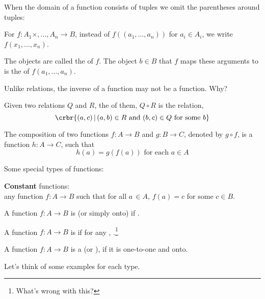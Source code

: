 \documentclass[11pt]{article}
\begin{document}
{ \item When the domain of a function consists of tuples we omit the parentheses
 around tuples: 
 
\item[] For $f: A_1\times,\ldots,A_n \rightarrow B$,
  instead of $f((a_1,\ldots,a_n))$ for $a_i\in A_i$, we write $f(x_1,\ldots,x_n)$.
 
\item[] The objects  are called the  of
$f$. The object $b\in B$ that $f$ maps these arguments to is the  of
$f(a_1,\ldots,a_n)$.


\hrulefill
\begin{uexercise}\label{ex-inverse}
Unlike relations, the inverse of a function may not be a function. Why?
\end{uexercise}
\hrulefill


\item Given two relations $Q$ and $R$,
the  of them, $Q\circ R$ is the relation,
\[
\crbr{(a,c)\,|\, (a,b) \in R \text{ and } (b,c) \in Q \text{ for some } b}
\]


\item The composition of two functions $f:A\rightarrow B$ and $g:B\rightarrow C$,
denoted by $g\circ f$, is a function $h:A \rightarrow C$, such that
\[
h(a) = g(f(a)) \text{ for each } a \in A
\]


\item Some special types of functions:

\item[] {\bf Constant} functions:\\
any function $f:A\rightarrow B$ such that for all $a\, \in A$, $f(a) = c$ for
some $c\in B$.

\item[] A function $f:A\rightarrow B$ is   (or simply onto)
if .

\item[] A function $f:A\rightarrow B$ is  if for any
, .\footnote{What's wrong with
this?}

\item[]A function $f:A\rightarrow B$ is a  (or
), if it is one-to-one and onto.


\item Let's think of some examples for each type.

}
\end{document}
